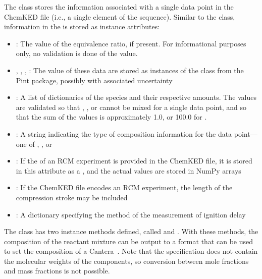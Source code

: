 \documentclass[12pt]{ussci}
\newcommand\ck{ChemKED}
\begin{document}
The  class stores the information associated with a single data
point in the \ck{} file (i.e., a single element of the 
sequence). Similar to the  class, information in the
 is stored as instance attributes:
%
\begin{itemize}
    \item {}: The value of the equivalence ratio, if
    present. For informational purposes only, no validation is done of the
    value.
    \item {}, , ,
    : The value of these data are stored as instances of
    the  class from the Pint \autocite{Grecco2016} package,
    possibly with associated uncertainty
    \item {}: A list of dictionaries of the species and their
    respective amounts. The values are validated so that ,
    , or  cannot be mixed for a single
    data point, and so that the sum of the values is approximately 1.0, or
    100.0 for .
    \item {}: A string indicating the type of composition
    information for the data point---one of ,
    , or 
    \item {}: If the  of an RCM
    experiment is provided in the \ck{} file, it is stored in this attribute as
    a , and the actual values are stored in NumPy arrays
    \autocite{vanderWalt:2011np}
    \item {}: If the \ck{} file encodes an RCM experiment,
    the length of the compression stroke may be included
    \item {}: A dictionary specifying the method of the
    measurement of ignition delay
\end{itemize}

The  class has two instance methods defined, called
 and .
With these methods, the composition of the reactant mixture can be output to a
format that can be used to set the composition of a Cantera~.
Note that the  specification does not contain the molecular
weights of the components, so conversion between mole fractions and mass
fractions is not possible.
\end{document}
